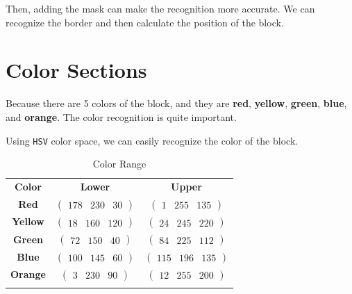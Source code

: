 \documentclass{article}
\begin{document}
Then, adding the mask can make the recognition more accurate. We can recognize the border and then calculate the position of the block.

\appendix

\section{Color Sections}

Because there are 5 colors of the block, and they are \textbf{red}, \textbf{yellow}, \textbf{green}, \textbf{blue}, and \textbf{orange}. The color recognition is quite important.

Using \texttt{HSV} color space, we can easily recognize the color of the block.

\begin{table}
    \centering
    \begin{tabular}{ccc}
        \hfill
        \textbf{Color} & \textbf{Lower} & \textbf{Upper} \\
        \hfill
        \textbf{Red} & $\left(\begin{matrix}178&230&30\end{matrix}\right)$ & $\left(\begin{matrix}1&255&135\end{matrix}\right)$ \\
        \textbf{Yellow} & $\left(\begin{matrix}18&160&120\end{matrix}\right)$ & $\left(\begin{matrix}24&245&220\end{matrix}\right)$ \\
        \textbf{Green} & $\left(\begin{matrix}72&150&40\end{matrix}\right)$ & $\left(\begin{matrix}84&225&112\end{matrix}\right)$ \\
        \textbf{Blue} & $\left(\begin{matrix}100&145&60\end{matrix}\right)$ & $\left(\begin{matrix}115&196&135\end{matrix}\right)$ \\
        \textbf{Orange} & $\left(\begin{matrix}3&230&90\end{matrix}\right)$ & $\left(\begin{matrix}12&255&200\end{matrix}\right)$ \\
        \hfill
    \end{tabular}
    \caption{Color Range}
\end{table}
\end{document}
